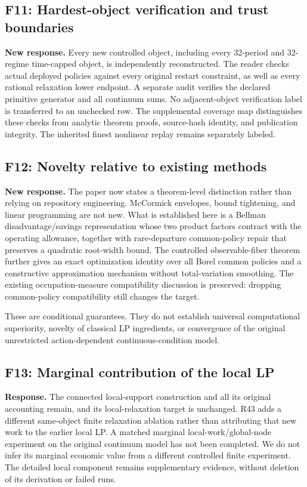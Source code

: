 \subsection*{F11: Hardest-object verification and trust boundaries}
\textbf{New response.} Every new controlled object, including every 32-period and 32-regime time-capped object, is independently reconstructed. The reader checks actual deployed policies against every original restart constraint, as well as every rational relaxation lower endpoint. A separate audit verifies the declared primitive generator and all continuum sums. No adjacent-object verification label is transferred to an unchecked row. The supplemental coverage map distinguishes these checks from analytic theorem proofs, source-hash identity, and publication integrity. The inherited finest nonlinear replay remains separately labeled.

\subsection*{F12: Novelty relative to existing methods}
\textbf{New response.} The paper now states a theorem-level distinction rather than relying on repository engineering. McCormick envelopes, bound tightening, and linear programming are not new. What is established here is a Bellman disadvantage/savings representation whose two product factors contract with the operating allowance, together with rare-departure common-policy repair that preserves a quadratic root-width bound. The controlled observable-fiber theorem further gives an exact optimization identity over all Borel common policies and a constructive approximation mechanism without total-variation smoothing. The existing occupation-measure compatibility discussion is preserved: dropping common-policy compatibility still changes the target.

These are conditional guarantees. They do not establish universal computational superiority, novelty of classical LP ingredients, or convergence of the original unrestricted action-dependent continuous-condition model.

\subsection*{F13: Marginal contribution of the local LP}
\textbf{Response.} The connected local-support construction and all its original accounting remain, and its local-relaxation target is unchanged. R43 adds a different same-object finite relaxation ablation rather than attributing that new work to the earlier local LP. A matched marginal local-work/global-node experiment on the original continuum model has not been completed. We do not infer its marginal economic value from a different controlled finite experiment. The detailed local component remains supplementary evidence, without deletion of its derivation or failed runs.


